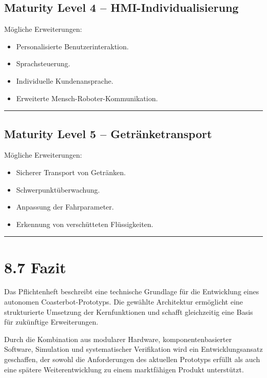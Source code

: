 \documentclass[
]{article}
\providecommand{\tightlist}{%
  \setlength{\itemsep}{0pt}\setlength{\parskip}{0pt}}
\begin{document}
\subsection{Maturity Level 4 --
HMI-Individualisierung}\label{maturity-level-4-hmi-individualisierung}

Mögliche Erweiterungen:

\begin{itemize}
\tightlist
\item
  Personalisierte Benutzerinteraktion.
\item
  Sprachsteuerung.
\item
  Individuelle Kundenansprache.
\item
  Erweiterte Mensch-Roboter-Kommunikation.
\end{itemize}

\begin{center}\rule{0.5\linewidth}{0.5pt}\end{center}

\subsection{Maturity Level 5 --
Getränketransport}\label{maturity-level-5-getruxe4nketransport}

Mögliche Erweiterungen:

\begin{itemize}
\tightlist
\item
  Sicherer Transport von Getränken.
\item
  Schwerpunktüberwachung.
\item
  Anpassung der Fahrparameter.
\item
  Erkennung von verschütteten Flüssigkeiten.
\end{itemize}

\begin{center}\rule{0.5\linewidth}{0.5pt}\end{center}

\section{8.7 Fazit}\label{fazit}

Das Pflichtenheft beschreibt eine technische Grundlage für die
Entwicklung eines autonomen Coasterbot-Prototyps. Die gewählte
Architektur ermöglicht eine strukturierte Umsetzung der Kernfunktionen
und schafft gleichzeitig eine Basis für zukünftige Erweiterungen.

Durch die Kombination aus modularer Hardware, komponentenbasierter
Software, Simulation und systematischer Verifikation wird ein
Entwicklungsansatz geschaffen, der sowohl die Anforderungen des
aktuellen Prototyps erfüllt als auch eine spätere Weiterentwicklung zu
einem marktfähigen Produkt unterstützt.
\end{document}
